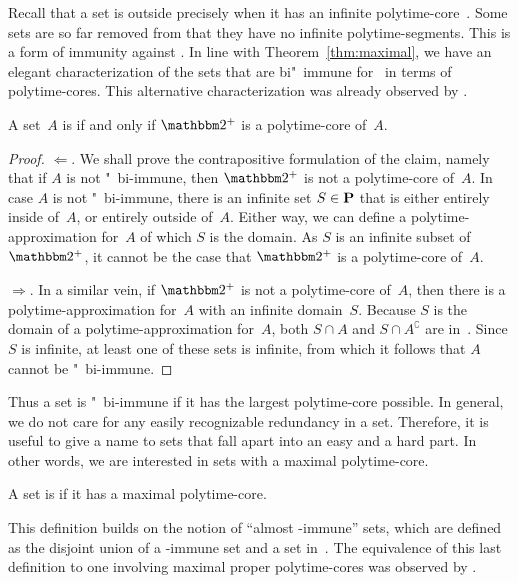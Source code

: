 Recall that a set is outside  precisely when it has an infinite polytime-core~\parencite{lynch1975reducibility}.
Some sets are so far removed from  that they have no infinite polytime-segments.
This is a form of immunity against .
In line with Theorem~\ref{thm:maximal}, we have an elegant characterization of the sets that are bi"~immune for~ in terms of polytime-cores.
This alternative characterization was already observed by \textcite{balcazar1985bi-immune} \parencite[see also][]{book1988polynomial}.
\begin{theorem}
  A set~$A$ is  if and only if $\binary^+$ is a polytime-core of~$A$.
\end{theorem}
\begin{proof}
  $\Longleftarrow$.
  We shall prove the contrapositive formulation of the claim, namely that if $A$ is not "~bi-immune, then $\binary^+$ is not a polytime-core of~$A$.
  In case $A$ is not "~bi-immune, there is an infinite set $S \in \textnormal{\textbf{P}}$ that is either entirely inside of~$A$, or entirely outside of~$A$.
  Either way, we can define a polytime-approximation for~$A$ of which $S$ is the domain.
  As $S$ is an infinite subset of $\binary^+$, it cannot be the case that $\binary^+$ is a polytime-core of~$A$.

  $\Longrightarrow$.
  In a similar vein, if $\binary^+$ is not a polytime-core of~$A$, then there is a polytime-approximation for~$A$ with an infinite domain~$S$.
  Because $S$ is the domain of a polytime-approximation for~$A$, both $S \cap A$ and $S \cap A^\complement$ are in~.
  Since $S$ is infinite, at least one of these sets is infinite, from which it follows that $A$ cannot be "~bi-immune.
\end{proof}

Thus a set is "~bi-immune if it has the largest polytime-core possible.
In general, we do not care for any easily recognizable redundancy in a set.
Therefore, it is useful to give a name to sets that fall apart into an easy and a hard part.
In other words, we are interested in sets with a maximal polytime-core.
\begin{definition}
  A set is  if it has a maximal polytime-core.
\end{definition}
This definition builds on the notion of \enquote{almost -immune} sets, which are defined as the disjoint union of a -immune set and a set in~.
The equivalence of this last definition to one involving maximal proper polytime-cores was observed by \textcite{orponen1986classification}.


